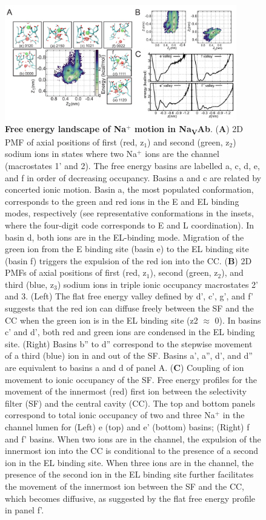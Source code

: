 \begin{refsection}
\begin{figure}[hp]
\centering
\includegraphics[width=0.9\textwidth]{nav1/Nav1FigS4}
\caption[Free energy landscape of Na$^{+}$ motion in Na\textsubscript{V}Ab]{\textbf{Free energy landscape of Na$^{+}$ motion in Na\textsubscript{V}Ab}. (\textbf{A}) 2D PMF of axial positions of first (red, z$_1$) and second (green, z$_2$) sodium ions in states where two Na$^+$ ions are the channel (macrostates 1' and 2).  The free energy basins are labelled a, c, d, e, and f in order of decreasing occupancy.  Basins a and c are related by concerted ionic motion.  Basin a, the most populated conformation, corresponds to the green and red ions in the E and EL binding modes, respectively (see representative conformations in the insets, where the four-digit code corresponds to E and L coordination).  In basin d, both ions are in the EL-binding mode.   Migration of the green ion from the E binding site (basin e) to the EL binding site (basin f) triggers the expulsion of the red ion into the CC.  (\textbf{B}) 2D PMFs of axial positions of first (red, z$_1$), second (green, z$_2$), and third (blue, z$_3$) sodium ions in triple ionic occupancy macrostates 2' and 3.  (Left) The flat free energy valley defined by d', c', g', and f' suggests that the red ion can diffuse freely between the SF and the CC when the green ion is in the EL binding site (z2 $\approx$ 0).  In basins c' and d', both red and green ions are condensed in the EL binding site.  (Right) Basins b'' to d'' correspond to the stepwise movement of a third (blue) ion in and out of the SF.  Basins a', a'', d', and d'' are equivalent to basins a and d of panel A.  (\textbf{C}) Coupling of ion movement to ionic occupancy of the SF.  Free energy profiles for the movement of the innermost (red) first ion between the selectivity filter (SF) and the central cavity (CC).  The top and bottom panels correspond to total ionic occupancy of two and three Na$^+$ in the channel lumen for (Left) e (top) and e' (bottom) basins; (Right) f and f' basins.  When two ions are in the channel, the expulsion of the innermost ion into the CC is conditional to the presence of a second ion in the EL binding site.  When three ions are in the channel, the presence of the second ion in the EL binding site further facilitates the movement of the innermost ion between the SF and the CC, which becomes diffusive, as suggested by the flat free energy profile in panel f'.}
\label{fig:nav1figS4}
\end{figure}


\end{refsection}
